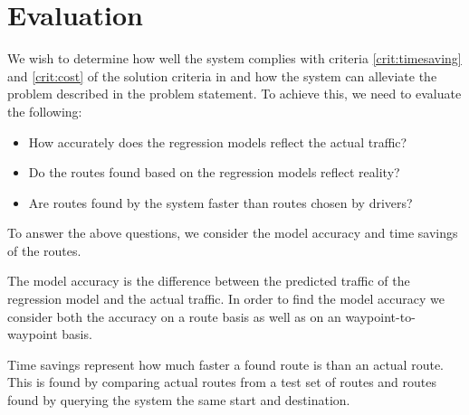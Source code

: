 \section{Evaluation}
We wish to determine how well the system complies with criteria \ref{crit:timesaving} and \ref{crit:cost} of the solution criteria in  and how the system can alleviate the problem described in the problem statement. To achieve this, we need to evaluate the following:
\begin{itemize}
\item How accurately does the regression models reflect the actual traffic?
\item Do the routes found based on the regression models reflect reality?
\item Are routes found by the system faster than routes chosen by drivers?
\end{itemize}
To answer the above questions, we consider the model accuracy and time savings of the routes. 

The model accuracy is the difference between the predicted traffic of the regression model and the actual traffic. In order to find the model accuracy we consider both the accuracy on a route basis as well as on an waypoint-to-waypoint basis.

Time savings represent how much faster a found route is than an actual route. This is found by comparing actual routes from a test set of routes and routes found by querying the system the same start and destination.

